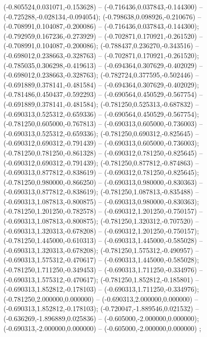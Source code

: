  (-0.805524,0.031071,-0.153628) -- (-0.716436,0.037843,-0.144300) -- (-0.725288,-0.028134,-0.094054);
 (-0.798638,0.098926,-0.210676) -- (-0.708991,0.104087,-0.200086) -- (-0.716436,0.037843,-0.144300);
 (-0.792959,0.167236,-0.273929) -- (-0.702871,0.170921,-0.261520) -- (-0.708991,0.104087,-0.200086);
 (-0.788437,0.236270,-0.343516) -- (-0.698012,0.238663,-0.328763) -- (-0.702871,0.170921,-0.261520);
 (-0.785035,0.306298,-0.419613) -- (-0.694364,0.307629,-0.402029) -- (-0.698012,0.238663,-0.328763);
 (-0.782724,0.377595,-0.502446) -- (-0.691889,0.378141,-0.481584) -- (-0.694364,0.307629,-0.402029);
 (-0.781486,0.450437,-0.592293) -- (-0.690564,0.450529,-0.567754) -- (-0.691889,0.378141,-0.481584);
 (-0.781250,0.525313,-0.687832) -- (-0.690313,0.525312,-0.659336) -- (-0.690564,0.450529,-0.567754);
 (-0.781250,0.605000,-0.767813) -- (-0.690313,0.605000,-0.736003) -- (-0.690313,0.525312,-0.659336);
 (-0.781250,0.690312,-0.825645) -- (-0.690312,0.690312,-0.791439) -- (-0.690313,0.605000,-0.736003);
 (-0.781250,0.781250,-0.861328) -- (-0.690312,0.781250,-0.825645) -- (-0.690312,0.690312,-0.791439);
 (-0.781250,0.877812,-0.874863) -- (-0.690313,0.877812,-0.838619) -- (-0.690312,0.781250,-0.825645);
 (-0.781250,0.980000,-0.866250) -- (-0.690313,0.980000,-0.830363) -- (-0.690313,0.877812,-0.838619);
 (-0.781250,1.087813,-0.835488) -- (-0.690313,1.087813,-0.800875) -- (-0.690313,0.980000,-0.830363);
 (-0.781250,1.201250,-0.782578) -- (-0.690312,1.201250,-0.750157) -- (-0.690313,1.087813,-0.800875);
 (-0.781250,1.320312,-0.707520) -- (-0.690313,1.320313,-0.678208) -- (-0.690312,1.201250,-0.750157);
 (-0.781250,1.445000,-0.610313) -- (-0.690313,1.445000,-0.585028) -- (-0.690313,1.320313,-0.678208);
 (-0.781250,1.575312,-0.490957) -- (-0.690313,1.575312,-0.470617) -- (-0.690313,1.445000,-0.585028);
 (-0.781250,1.711250,-0.349453) -- (-0.690313,1.711250,-0.334976) -- (-0.690313,1.575312,-0.470617);
 (-0.781250,1.852812,-0.185801) -- (-0.690313,1.852812,-0.178103) -- (-0.690313,1.711250,-0.334976);
 (-0.781250,2.000000,0.000000) -- (-0.690313,2.000000,0.000000) -- (-0.690313,1.852812,-0.178103);
 (-0.720047,-1.889546,0.021532) -- (-0.636269,-1.896889,0.025836) -- (-0.605000,-2.000000,0.000000);
 (-0.690313,-2.000000,0.000000) -- (-0.605000,-2.000000,0.000000) ;
